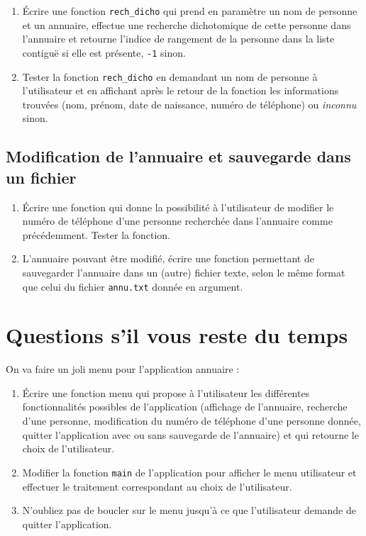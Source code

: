 \documentclass[final, a4paper, openbib, ]{article}
\begin{document}
\begin{enumerate}
	\item Écrire une fonction \texttt{rech\_dicho} qui prend en paramètre un nom de personne et un annuaire, effectue une recherche dichotomique de cette personne dans l'annuaire
	et retourne l'indice de rangement de la personne dans la liste contiguë si elle est
	présente, \texttt{-1} sinon.
	\item Tester la fonction \texttt{rech\_dicho} en demandant un nom de personne à l'utilisateur et en affichant après le retour de la fonction les informations trouvées (nom, prénom, date de naissance, numéro de téléphone) ou \textit{inconnu} sinon.
\end{enumerate}

\subsection{Modification de l'annuaire et sauvegarde dans un fichier}

\begin{enumerate}
	\item Écrire une fonction qui donne la possibilité à l'utilisateur de modifier le numéro de téléphone d'une personne recherchée dans l'annuaire comme précédemment.
	Tester la fonction.
	\item L'annuaire pouvant être modifié, écrire une fonction permettant de sauvegarder l'annuaire dans un (autre) fichier texte, selon le même format que celui du fichier \texttt{annu.txt} donnée en argument.
\end{enumerate}


\section{Questions s’il vous reste du temps}

On va faire un joli menu pour l'application annuaire :

\begin{enumerate}
	\item Écrire une fonction menu qui propose à l'utilisateur les différentes fonctionnalités possibles de l'application (affichage de l'annuaire, recherche d'une personne, modification du numéro de téléphone d'une personne donnée, quitter l'application avec ou sans sauvegarde de l'annuaire) et qui retourne le choix de l'utilisateur.
	\item Modifier la fonction \texttt{main} de l'application pour afficher le menu utilisateur et effectuer le traitement correspondant au choix de l'utilisateur.
	\item N'oubliez pas de boucler sur le menu jusqu'à ce que l'utilisateur demande de quitter l'application.
\end{enumerate}
\end{document}
